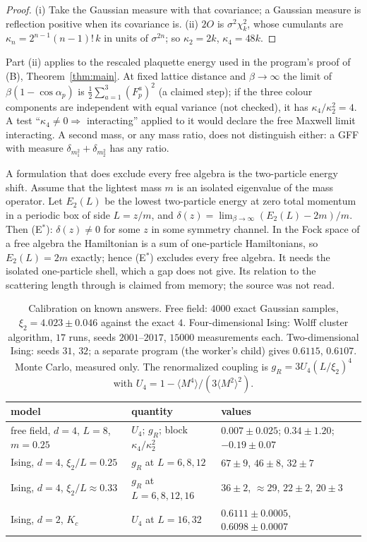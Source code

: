 \begin{proof}
(i) Take the Gaussian measure with that covariance; a Gaussian measure is reflection positive
when its covariance is. (ii) $2O$ is $\sigma^2\chi^2_k$, whose cumulants are
$\kappa_n=2^{n-1}(n-1)!\,k$ in units of $\sigma^{2n}$; so $\kappa_2=2k$, $\kappa_4=48k$.
\end{proof}

Part (ii) applies to the rescaled plaquette energy used in the program's proof of (B),
Theorem~\ref{thm:main}. At fixed lattice distance and
$\beta\to\infty$ the limit of $\beta(1-\cos\alpha_p)$ is $\frac12\sum_{a=1}^3(F^a_p)^2$ (a claimed
step); if the three colour components are independent with equal variance (not checked), it
has $\kappa_4/\kappa_2^2=4$. A test ``$\kappa_4\ne0\Rightarrow$ interacting'' applied to it would
declare the free Maxwell limit interacting. A second mass, or any mass ratio, does not
distinguish either: a GFF with measure $\delta_{m_1^2}+\delta_{m_2^2}$ has any ratio.

A formulation that does exclude every free algebra is the two-particle energy shift. Assume
that the lightest mass $m$ is an isolated eigenvalue of the mass operator. Let $E_2(L)$ be the
lowest two-particle energy at zero total momentum in a periodic box of side $L=z/m$, and
$\delta(z)=\lim_{\beta\to\infty}(E_2(L)-2m)/m$. Then (E$^*$): $\delta(z)\ne0$ for some $z$ in some
symmetry channel. In the Fock space of a free algebra the Hamiltonian is a sum of one-particle
Hamiltonians, so $E_2(L)=2m$ exactly; hence (E$^*$) excludes every free algebra. It needs the
isolated one-particle shell, which a gap does not give. Its relation to the scattering length
through \cite{LW86} is claimed from memory; the source was not read.

\begin{table}[ht]
\centering
\small
\begin{tabular}{@{}lll@{}}
\toprule
model & quantity & values \\
\midrule
free field, $d=4$, $L=8$, $m=0.25$ & $U_4$; $g_R$; block $\kappa_4/\kappa_2^2$ & $0.007\pm0.025$; $0.34\pm1.20$; $-0.19\pm0.07$ \\
Ising, $d=4$, $\xi_2/L=0.25$ & $g_R$ at $L=6,8,12$ & $67\pm9$, $46\pm8$, $32\pm7$ \\
Ising, $d=4$, $\xi_2/L\approx0.33$ & $g_R$ at $L=6,8,12,16$ & $36\pm2$, $\approx29$, $22\pm2$, $20\pm3$ \\
Ising, $d=2$, $K_c$ & $U_4$ at $L=16,32$ & $0.6111\pm0.0005$, $0.6098\pm0.0007$ \\
\bottomrule
\end{tabular}
\caption{Calibration on known answers. Free field: $4000$ exact Gaussian samples, $\xi_2=4.023\pm0.046$
against the exact $4$. Four-dimensional Ising: Wolff cluster algorithm, $17$ runs, seeds
$2001$--$2017$, $15000$ measurements each. Two-dimensional Ising: seeds $31$, $32$; a separate
program (the worker's child) gives $0.6115$, $0.6107$. Monte Carlo, measured only. The
renormalized coupling is $g_R=3U_4(L/\xi_2)^4$ with $U_4=1-\langle M^4\rangle/(3\langle M^2\rangle^2)$.}
\label{neg:tab-ising}
\end{table}

